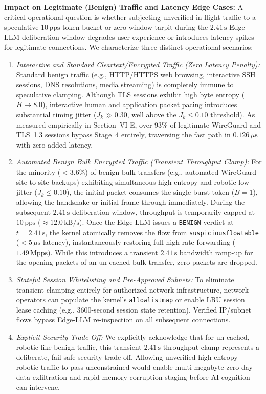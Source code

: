 \documentclass{ieeeaccess}
\renewcommand{\_}{\textunderscore\allowbreak}
\begin{document}
\textbf{Impact on Legitimate (Benign) Traffic and Latency Edge Cases:}
A critical operational question is whether subjecting unverified in-flight traffic to a speculative $10\,\text{pps}$ token bucket or zero-window tarpit during the $2.41\,\text{s}$ Edge-LLM deliberation window degrades user experience or introduces latency spikes for legitimate connections. We characterize three distinct operational scenarios:
\begin{enumerate}
  \item \textit{Interactive and Standard Cleartext/Encrypted Traffic (Zero Latency Penalty):} Standard benign traffic (e.g., HTTP/HTTPS web browsing, interactive SSH sessions, DNS resolutions, media streaming) is completely immune to speculative clamping. Although TLS sessions exhibit high byte entropy ($H \to 8.0$), interactive human and application packet pacing introduces substantial timing jitter ($J_k \gg 0.30$, well above the $J_k \le 0.10$ threshold). As measured empirically in Section~VI-E, over $93\%$ of legitimate WireGuard and TLS~1.3 sessions bypass Stage~4 entirely, traversing the fast path in $0.126\,\mu\text{s}$ with zero added latency.
  \item \textit{Automated Benign Bulk Encrypted Traffic (Transient Throughput Clamp):} For the minority ($< 3.6\%$) of benign bulk transfers (e.g., automated WireGuard site-to-site backups) exhibiting simultaneous high entropy and robotic low jitter ($J_k \le 0.10$), the initial packet consumes the single burst token ($B=1$), allowing the handshake or initial frame through immediately. During the subsequent $2.41\,\text{s}$ deliberation window, throughput is temporarily capped at $10\,\text{pps}$ ($\approx 12.0\,\text{kB/s}$). Once the Edge-LLM issues a \texttt{BENIGN} verdict at $t = 2.41\,\text{s}$, the kernel atomically removes the flow from \texttt{suspicious\_flow\_table} ($< 5\,\mu\text{s}$ latency), instantaneously restoring full high-rate forwarding ($1.49\,\text{Mpps}$). While this introduces a transient $2.41\,\text{s}$ bandwidth ramp-up for the opening packets of an un-cached bulk transfer, zero packets are dropped.
  \item \textit{Stateful Session Whitelisting and Pre-Approved Subnets:} To eliminate transient clamping entirely for authorized network infrastructure, network operators can populate the kernel's \texttt{allowlist\_map} or enable LRU session lease caching (e.g., 3600-second session state retention). Verified IP/subnet flows bypass Edge-LLM re-inspection on all subsequent connections.
  \item \textit{Explicit Security Trade-Off:} We explicitly acknowledge that for un-cached, robotic-like benign traffic, this transient $2.41\,\text{s}$ throughput clamp represents a deliberate, fail-safe security trade-off. Allowing unverified high-entropy robotic traffic to pass unconstrained would enable multi-megabyte zero-day data exfiltration and rapid memory corruption staging before AI cognition can intervene.
\end{enumerate}
\end{document}
